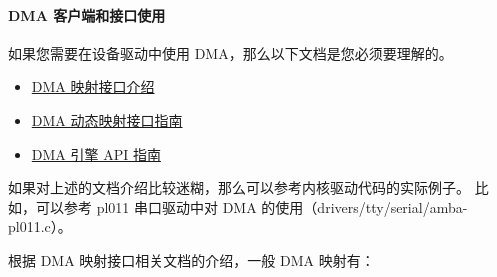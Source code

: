 \paragraph{DMA 客户端和接口使用}

如果您需要在设备驱动中使用 DMA，那么以下文档是您必须要理解的。

\begin{itemize}
  \item \href{https://www.kernel.org/doc/Documentation/DMA-API.txt}{DMA 映射接口介绍}
  \item \href{https://www.kernel.org/doc/Documentation/DMA-API-HOWTO.txt}{DMA 动态映射接口指南}
  \item \href{https://www.kernel.org/doc/Documentation/dmaengine/client.txt}{DMA 引擎 API 指南}
\end{itemize}

如果对上述的文档介绍比较迷糊，那么可以参考内核驱动代码的实际例子。
比如，可以参考 pl011 串口驱动中对 DMA 的使用（drivers/tty/serial/amba-pl011.c）。

根据 DMA 映射接口相关文档的介绍，一般 DMA 映射有：

